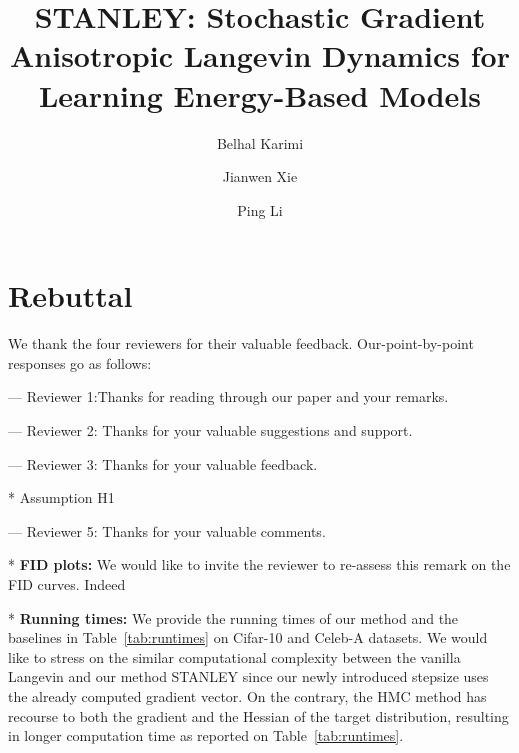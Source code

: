 \documentclass{article}
\title{STANLEY: Stochastic Gradient Anisotropic Langevin Dynamics for Learning Energy-Based Models}
\author{Belhal Karimi \and Jianwen Xie \and Ping Li}
\date{}
\begin{document}
\maketitle

\section{Rebuttal}

We thank the four reviewers for their valuable feedback. 
Our-point-by-point responses go as follows:


--- Reviewer 1:Thanks for reading through our paper and your remarks. 




--- Reviewer 2: Thanks for your valuable suggestions and support. 



--- Reviewer 3: Thanks for your valuable feedback.

* Assumption H1



--- Reviewer 5: Thanks for your valuable comments.

* \textbf{FID plots:} We would like to invite the reviewer to re-assess this remark on the FID curves. Indeed


* \textbf{Running times:} We provide the running times of our method and the baselines in Table~\ref{tab:runtimes} on Cifar-10 and Celeb-A datasets.
We would like to stress on the similar computational complexity between the vanilla Langevin and our method STANLEY since our newly introduced stepsize uses the already computed gradient vector. On the contrary, the HMC method has recourse to both the gradient and the Hessian of the target distribution, resulting in longer computation time as reported on Table~\ref{tab:runtimes}.

\begin{table}[h]
\small
\caption{ Runtime in seconds for training our EBM during 1 epoch.}\label{tab:runtimes}
	\vspace{-0.1in}
\end{table}
\end{document}
